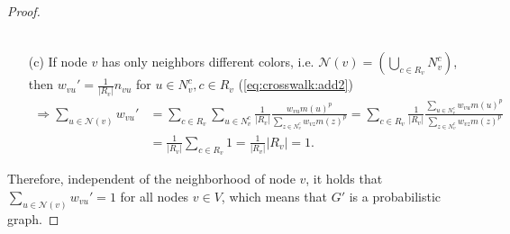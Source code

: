 \begin{proof}
\begin{enumerate}
\begin{align*}
    \end{align*}
    \item[(c)] If node $v$ has only neighbors different colors, i.e. $\mathcal{N}(v) = \left( \bigcup_{c \in R_v} N_v^{c} \right)$, then $w_{vu}' = \frac{1}{|R_v|} n_{vu}$ for $u \in N_v^c, c \in R_v$ (\autoref{eq:crosswalk:add2})
    \begin{align*}
         \Rightarrow \sum_{u \in \mathcal{N}(v)} w_{vu}' &= \sum_{c \in R_v} \sum_{u \in N_v^c} \frac{1}{|R_v|} \frac{w_{vu} m(u)^p}{\sum_{z \in N_v^c} w_{vz} m(z)^p} = \sum_{c \in R_v} \frac{1}{|R_v|} \frac{\sum_{u \in N_v^c} w_{vu} m(u)^p}{\sum_{z \in N_v^c} w_{vz} m(z)^p} \\
         &= \frac{1}{|R_v|} \sum_{c \in R_v} 1 = \frac{1}{|R_v|} |R_v| = 1.
    \end{align*}
\end{enumerate}
Therefore, independent of the neighborhood of node $v$, it holds that $\sum_{u \in \mathcal{N}(v)} w_{vu}' = 1$ for all nodes $v \in V$, which means that $G'$ is a probabilistic graph.
\end{proof}


        

